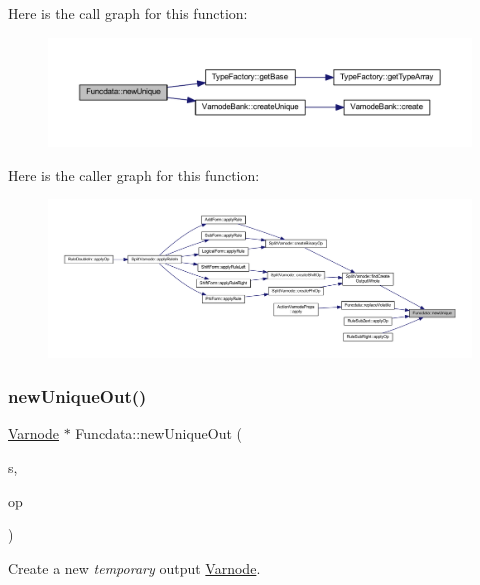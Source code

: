 Here is the call graph for this function\+:
\nopagebreak
\begin{figure}[H]
\begin{center}
\leavevmode
\includegraphics[width=350pt]{class_funcdata_a731f6fd415269577b7bb1943315b8a76_cgraph}
\end{center}
\end{figure}
Here is the caller graph for this function\+:
\nopagebreak
\begin{figure}[H]
\begin{center}
\leavevmode
\includegraphics[width=350pt]{class_funcdata_a731f6fd415269577b7bb1943315b8a76_icgraph}
\end{center}
\end{figure}
\mbox{\label{class_funcdata_af189a9a5b390332c6e87c8faa334cd68}} 
\subsubsection{\texorpdfstring{newUniqueOut()}{newUniqueOut()}}
{\footnotesize\ttfamily \mbox{\hyperlink{class_varnode}{Varnode}} $\ast$ Funcdata\+::new\+Unique\+Out (\begin{DoxyParamCaption}\item[{int4}]{s,  }\item[{\mbox{\hyperlink{class_pcode_op}{Pcode\+Op}} $\ast$}]{op }\end{DoxyParamCaption})}



Create a new {\itshape temporary} output \mbox{\hyperlink{class_varnode}{Varnode}}. 


